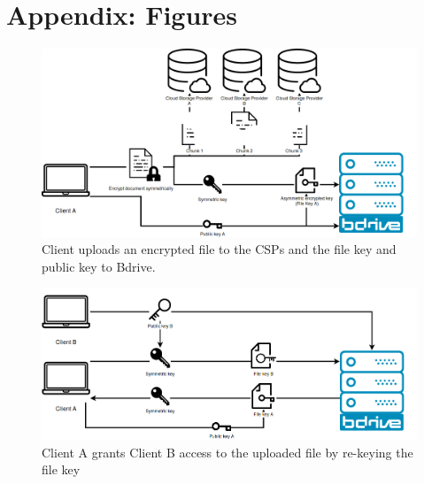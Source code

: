 \documentclass[twocolumn]{article}
\begin{document}
\section{Appendix: Figures}
\begin{figure}[!ht]
\centering
    \includegraphics[width=0.8\linewidth]{img/bdrive1.png}\par 
    \caption{Client uploads an encrypted file to the CSPs and the file key and public key to Bdrive.}
    \label{fig:filekey}
\end{figure}
\begin{figure}[!ht]
\centering
    \includegraphics[width=0.8\linewidth]{img/bdrive2.png}\par
    \caption{Client A grants Client B access to the uploaded file by re-keying the file key}
    \label{fig:rekey}
\end{figure}

\end{document}
